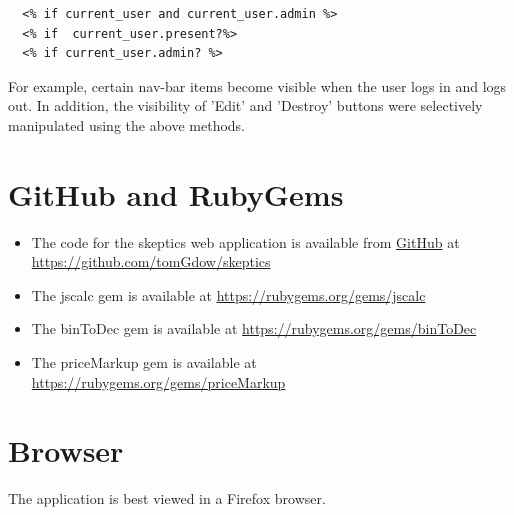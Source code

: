 \documentclass[11pt]{article}
\begin{document}
  \begin{verbatim}
  <% if current_user and current_user.admin %>
  <% if  current_user.present?%>
  <% if current_user.admin? %>
  \end{verbatim}
  

  For example, certain nav-bar items become visible when the user logs in and logs out. In addition,
  the visibility of 'Edit' and 'Destroy' buttons were selectively manipulated using the above methods.
  \section{GitHub and RubyGems}
  \begin{itemize}
  \item[] The code for the skeptics web application is available from \href{https://github.com/tomGdow}{GitHub} at \url{https://github.com/tomGdow/skeptics} 
  
  \item[] The jscalc gem is available at \url{https://rubygems.org/gems/jscalc}
  \item[] The binToDec gem is available at \url{https://rubygems.org/gems/binToDec} 
  \item[] The priceMarkup gem is available at \url{https://rubygems.org/gems/priceMarkup}
  
  \end{itemize}
 \section{Browser} 
 The application is best viewed in a Firefox browser.   
\end{document}
